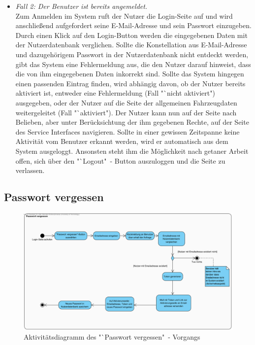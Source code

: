 \documentclass[fontsize = 12pt, paper = a4]{scrreprt}
\begin{document}
\begin{itemize}

\item \textit{Fall 2: Der Benutzer ist bereits angemeldet.} \\ 
Zum Anmelden im System ruft der Nutzer die Login-Seite auf und wird anschließend aufgefordert seine E-Mail-Adresse und sein Passwort einzugeben. Durch einen Klick auf den Login-Button werden die eingegebenen Daten mit der Nutzerdatenbank verglichen. Sollte die Konstellation aus E-Mail-Adresse und dazugehörigem Passwort in der Nutzerdatenbank nicht entdeckt werden, gibt das System eine Fehlermeldung aus, die den Nutzer darauf hinweist, dass die von ihm eingegebenen Daten inkorrekt sind. Sollte das System hingegen einen passenden Eintrag finden, wird abhängig davon, ob der Nutzer bereits aktiviert ist, entweder eine Fehlermeldung (Fall "`nicht aktiviert") ausgegeben, oder der Nutzer auf die Seite der allgemeinen Fahrzeugdaten weitergeleitet (Fall "`aktiviert"). Der Nutzer kann nun auf der Seite nach Belieben, aber unter Berücksichtung der ihm gegebenen Rechte, auf der Seite des Service Interfaces navigieren.
Sollte in einer gewissen Zeitspanne keine Aktivität vom Benutzer erkannt werden, wird er automatisch aus dem System ausgeloggt.
Ansonsten steht ihm die Möglichkeit nach getaner Arbeit offen, sich über den "`Logout"\ - Button auszuloggen und die Seite zu verlassen.

\end{itemize}

\newpage

\subsection{Passwort vergessen}

\begin{figure}
\centering
\includegraphics[scale = 0.6]{passwort_vergessen_vorgang}
\caption{Aktivitätsdiagramm des "`Passwort vergessen"\ - Vorgangs}
\end{figure} 
\end{document}
